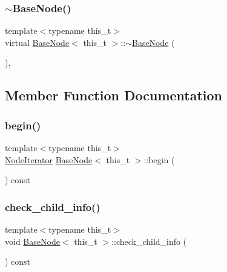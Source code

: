\subsubsection{\texorpdfstring{$\sim$\+Base\+Node()}{~BaseNode()}}
{\footnotesize\ttfamily template$<$typename this\+\_\+t$>$ \\
virtual \hyperlink{class_base_node}{Base\+Node}$<$ this\+\_\+t $>$\+::$\sim$\hyperlink{class_base_node}{Base\+Node} (\begin{DoxyParamCaption}{ }\end{DoxyParamCaption})\hspace{0.3cm}{\ttfamily [inline]}, {\ttfamily [virtual]}}



\subsection{Member Function Documentation}
\mbox{\label{class_base_node_ac735dd6fe296af4b8d2951cc6d9052c8}} 
\subsubsection{\texorpdfstring{begin()}{begin()}}
{\footnotesize\ttfamily template$<$typename this\+\_\+t$>$ \\
\hyperlink{class_base_node_1_1_node_iterator}{Node\+Iterator} \hyperlink{class_base_node}{Base\+Node}$<$ this\+\_\+t $>$\+::begin (\begin{DoxyParamCaption}{ }\end{DoxyParamCaption}) const\hspace{0.3cm}{\ttfamily [inline]}}

\mbox{\label{class_base_node_a83b33d8a8902819b4175b66fb6e4b08e}} 
\subsubsection{\texorpdfstring{check\+\_\+child\+\_\+info()}{check\_child\_info()}}
{\footnotesize\ttfamily template$<$typename this\+\_\+t$>$ \\
void \hyperlink{class_base_node}{Base\+Node}$<$ this\+\_\+t $>$\+::check\+\_\+child\+\_\+info (\begin{DoxyParamCaption}{ }\end{DoxyParamCaption}) const\hspace{0.3cm}{\ttfamily [inline]}}

